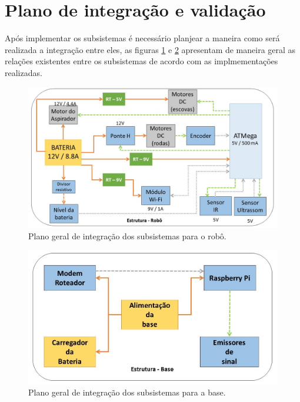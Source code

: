 \section{Plano de integração e validação} %
\label{sec:plano_de_integração_e_validação}
	Após implementar os subsistemas é necessário planjear a maneira como será realizada a integração entre eles, as figuras \ref{img:integração_robô} e \ref{img:integração_base} apresentam de maneira geral as relações existentes entre os subsistemas de acordo com as implmementações realizadas.

	\begin{figure}[H]                                                           
   		\centering                                                                
   		\includegraphics[scale=0.48]{figuras/plano_integracao_robo.jpg}               
   		\caption{Plano geral de integração dos subsistemas para o robô.}    
   		\label{img:integração_robô}                                            
   	\end{figure} 

   	\begin{figure}[H]                                                           
   		\centering                                                                
   		\includegraphics[scale=0.5]{figuras/plano_integracao_base.jpg}               
   		\caption{Plano geral de integração dos subsistemas para a base.}    
   		\label{img:integração_base}                                            
   	\end{figure} 

